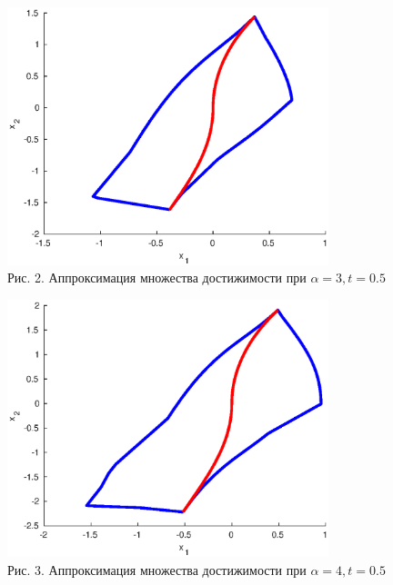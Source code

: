 \documentclass[11pt]{article}
\begin{document}
	\begin{center}
		\includegraphics[width=0.7\textwidth]{pic_2.eps}\\
		{Рис. 2. Аппроксимация множества достижимости при $\alpha = 3, t = 0.5$ }
	\end{center}

	\begin{center}
		\includegraphics[width=0.7\textwidth]{pic_3.eps}\\
		{Рис. 3. Аппроксимация множества достижимости при $\alpha = 4, t = 0.5$ }
	\end{center}
\end{document}
